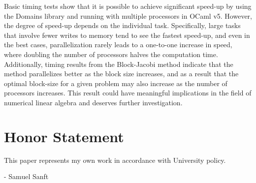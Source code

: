 \documentclass[pageno]{jpaper}
\begin{document}
\begin{doublespacing}
Basic timing tests show that it is possible to achieve significant speed-up by using the Domains library and running with multiple processors in OCaml v5. However, the degree of speed-up depends on the individual task. Specifically, large tasks that involve fewer writes to memory  tend to see the fastest speed-up, and even in the best cases, parallelization rarely leads to a one-to-one increase in speed, where doubling the number of processors halves the computation time. Additionally, timing results from the Block-Jacobi method indicate that the method parallelizes better as the block size increases, and as a result that the optimal block-size for a given problem may also increase as the number of processors increases. This result could have meaningful implications in the field of numerical linear algebra and deserves further investigation.

\section{Honor Statement}
This paper represents my own work in accordance with University policy.

\begin{flushright}
- Samuel Sanft
\end{flushright}

\end{doublespacing}



\end{document}
